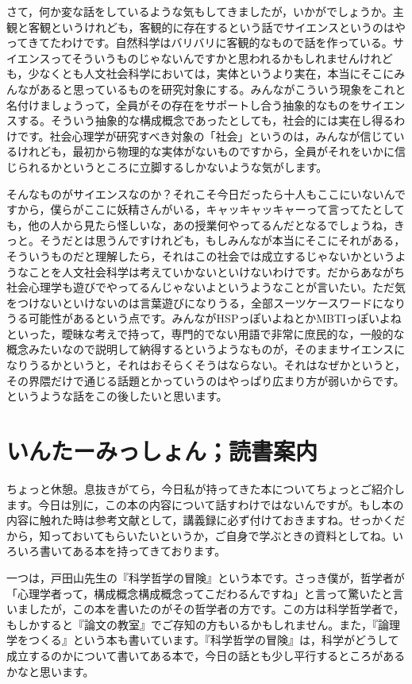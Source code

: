 \documentclass{ltjsbook}
\begin{document}
さて，何か変な話をしているような気もしてきましたが，いかがでしょうか。主観と客観というけれども，客観的に存在するという話でサイエンスというのはやってきてたわけです。自然科学はバリバリに客観的なもので話を作っている。サイエンスってそういうものじゃないんですかと思われるかもしれませんけれども，少なくとも人文社会科学においては，実体というより実在，本当にそこにみんながあると思っているものを研究対象にする。みんながこういう現象をこれと名付けましょうって，全員がその存在をサポートし合う抽象的なものをサイエンスする。そういう抽象的な構成概念であったとしても，社会的には実在し得るわけです。社会心理学が研究すべき対象の「社会」というのは，みんなが信じているけれども，最初から物理的な実体がないものですから，全員がそれをいかに信じられるかというところに立脚するしかないような気がします。

そんなものがサイエンスなのか？それこそ今日だったら十人もここにいないんですから，僕らがここに妖精さんがいる，キャッキャッキャーって言ってたとしても，他の人から見たら怪しいな，あの授業何やってるんだとなるでしょうね，きっと。そうだとは思うんですけれども，もしみんなが本当にそこにそれがある，そういうものだと理解したら，それはこの社会では成立するじゃないかというようなことを人文社会科学は考えていかないといけないわけです。だからあながち社会心理学も遊びでやってるんじゃないよというようなことが言いたい。ただ気をつけないといけないのは言葉遊びになりうる，全部スーツケースワードになりうる可能性があるという点です。みんながHSPっぽいよねとかMBTIっぽいよねといった，曖昧な考えで持って，専門的でない用語で非常に庶民的な，一般的な概念みたいなので説明して納得するというようなものが，そのままサイエンスになりうるかというと，それはおそらくそうはならない。それはなぜかというと，その界隈だけで通じる話題とかっていうのはやっぱり広まり方が弱いからです。というような話をこの後したいと思います。

\section*{いんたーみっしょん；読書案内}

ちょっと休憩。息抜きがてら，今日私が持ってきた本についてちょっとご紹介します。今日は別に，この本の内容について話すわけではないんですが。もし本の内容に触れた時は参考文献として，講義録に必ず付けておきますね。せっかくだから，知っておいてもらいたいというか，ご自身で学ぶときの資料としてね。いろいろ書いてある本を持ってきております。

一つは，戸田山先生の『科学哲学の冒険』という本\parencite{todayama2005}です。さっき僕が，哲学者が「心理学者って，構成概念構成概念ってこだわるんですね」と言って驚いたと言いましたが，この本を書いたのがその哲学者の方です。この方は科学哲学者で，もしかすると『論文の教室』\parencite{Todayama2022}でご存知の方もいるかもしれません。また，『論理学をつくる』という本\parencite{Todayama2000}も書いています。『科学哲学の冒険』は，科学がどうして成立するのかについて書いてある本で，今日の話とも少し平行するところがあるかなと思います。
\end{document}
